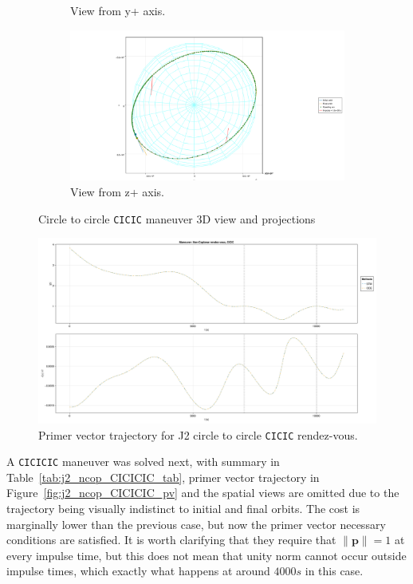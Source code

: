 \begin{figure}[htbp]
\begin{subfigure}{0.49\linewidth}
        \caption{View from y+ axis.}
    \end{subfigure}
    \begin{subfigure}{0.49\linewidth}
        \includegraphics[width=\linewidth]{../results/j2/ipv_noncop/CICIC_z+.png}
        \caption{View from z+ axis.}
    \end{subfigure}
    \caption{Circle to circle \texttt{CICIC} maneuver 3D view and projections}
    \label{fig:j2_ncop_CICIC_figs}
\end{figure}

\begin{figure}[htbp]
    \centering
    \includegraphics[width=\linewidth]{../results/j2/ipv_noncop/CICIC_primer_vector.png}
    \caption{Primer vector trajectory for J2 circle to circle \texttt{CICIC} rendez-vous.}
    \label{fig:j2_ncop_CICIC_pv}
\end{figure}

A \texttt{CICICIC} maneuver was solved next, with summary in Table~\ref{tab:j2_ncop_CICICIC_tab}, primer vector trajectory in Figure~\ref{fig:j2_ncop_CICICIC_pv} and the spatial views are omitted due to the trajectory being visually indistinct to initial and final orbits. The cost is marginally lower than the previous case, but now the primer vector necessary conditions are satisfied. It is worth clarifying that they require that \(\lVert \mathbf{p} \rVert = 1\) at every impulse time, but this does not mean that unity norm cannot occur outside impulse times, which exactly what happens at around \(4000 s\) in this case. 

